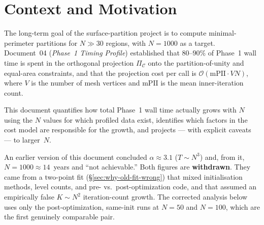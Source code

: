 \documentclass[11pt,a4paper]{article}
\begin{document}
\begin{abstract}
The corrected outlook: post-optimization seeded scaling between $N=50$ and
$N=100$ measures $\alpha\approx1.3$--$1.8$, and the intrinsic (fixed-iteration)
$N$-exponent likely sits at or above the top of that band ($\approx1.8$--$2.2$).
Under $\alpha\approx1.5$--$2$ this puts $N=1000$ at a matter of
\textbf{weeks-to-months} (an illustrative $\alpha\approx1.5$ gives $\sim\!43$
days; $\alpha\approx2$ gives $\sim\!190$ days), \emph{not} years.  That figure is
an extrapolation from only two-to-three post-optimization points over a
$20\times$ range in~$N$ and cannot be trusted beyond an order of magnitude; the
observed $\mathrm{mPII}$ growth could steepen the effective exponent further at
large~$N$.  The essential correction is
that the catastrophic ``$\sim\!14$ years / not achievable'' framing is
\textbf{not supported by the data}.  The dominant cost remains the orthogonal
projection ($80$--$87\%$ of wall), whose per-call cost scales as
$\mathcal{O}(\mathrm{mPII}\cdot VN)$; the durable algorithmic fix is a
closed-form simplex projection with a dual-Newton equal-area coupling
(\S\ref{sec:improvements}), which attacks $\mathrm{mPII}$ directly.
\end{abstract}

\tableofcontents
\newpage

\section{Context and Motivation}

The long-term goal of the surface-partition project is to compute
minimal-perimeter partitions for $N \gg 30$ regions, with $N = 1000$ as a
target.  Document~04 (\emph{Phase~1 Timing Profile}) established that
$80$--$90\%$ of Phase~1 wall time is spent in the orthogonal projection
$\Pi_{\mathcal{C}}$ onto the partition-of-unity and equal-area constraints,
and that the projection cost per call is $\mathcal{O}(\mathrm{mPII} \cdot V
N)$, where $V$ is the number of mesh vertices and $\mathrm{mPII}$ is the
mean inner-iteration count.

This document quantifies how total Phase~1 wall time actually grows with $N$
using the $N$ values for which profiled data exist, identifies which factors
in the cost model are responsible for the growth, and projects --- with
explicit caveats --- to larger~$N$.

\begin{remark}
\label{rem:retraction}
An earlier version of this document concluded $\alpha\approx3.1$ ($T\sim N^3$)
and, from it, $N=1000\approx14$~years and ``not achievable.''  Both figures are
\textbf{withdrawn}.  They came from a two-point fit
(\S\ref{sec:why-old-fit-wrong}) that mixed initialisation methods, level
counts, and pre- vs.\ post-optimization code, and that assumed an empirically
false $K\sim N^2$ iteration-count growth.  The corrected analysis below uses
only the post-optimization, same-init runs at $N=50$ and $N=100$, which are the
first genuinely comparable pair.
\end{remark}
\end{document}
